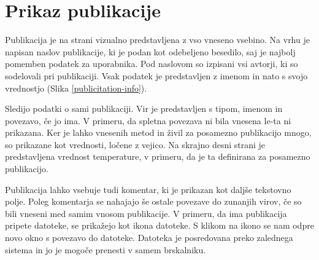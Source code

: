 \documentclass[a4paper, 12pt]{book}
\begin{document}
\section{Prikaz publikacije}
Publikacija je na strani vizualno predstavljena z vso vneseno vsebino. Na vrhu je napisan naslov publikacije, ki je podan kot odebeljeno besedilo, saj je najbolj pomemben podatek za uporabnika. Pod naslovom so izpisani vsi avtorji, ki so sodelovali pri publikaciji. Vsak podatek je predstavljen z imenom in nato s svojo vrednostjo (Slika \ref{publicitation-info}).

Sledijo podatki o sami publikaciji. Vir je predstavljen s tipom, imenom in povezavo, če jo ima. V primeru, da spletna povezava ni bila vnesena le-ta ni prikazana. Ker je lahko vnesenih metod in živil za posamezno publikacijo mnogo, so prikazane kot vrednosti, ločene z vejico. Na skrajno desni strani je predstavljena vrednost temperature, v primeru, da je ta definirana za posamezno publikacijo. 

Publikacija lahko vsebuje tudi komentar, ki je prikazan kot daljše tekstovno polje. Poleg komentarja se nahajajo še ostale povezave do zunanjih virov, če so bili vneseni med samim vnosom publikacije. V primeru, da ima publikacija pripete datoteke, se prikažejo kot ikona datoteke. S klikom na ikono se nam odpre novo okno s povezavo do datoteke. Datoteka je posredovana preko zalednega sistema in jo je mogoče prenesti v samem brskalniku.
\end{document}
